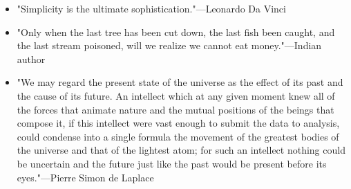 \begin{minipage}[t]{\textwidth}
	\vspace{-\baselineskip} %


    \begin{itemize}
        \item "Simplicity is the ultimate sophistication."{\tiny{---Leonardo Da Vinci}}
        \item "Only when the last tree has been cut down, the last fish been caught, and the last stream poisoned, will we realize we cannot eat money."{\tiny{---Indian author}}
        \item "We may regard the present state of the universe as the effect of its past and the cause of its future. An intellect which at any given moment knew all of the forces that animate nature and the mutual positions of the beings that compose it, if this intellect were vast enough to submit the data to analysis, could condense into a single formula the movement of the greatest bodies of the universe and that of the lightest atom; for such an intellect nothing could be uncertain and the future just like the past would be present before its eyes."{\tiny{---Pierre Simon de Laplace}}
    \end{itemize}
\end{minipage}


\null
\vspace*{\fill}

\noindent{\color{black!15}\rule{\textwidth}{.5pt}}



